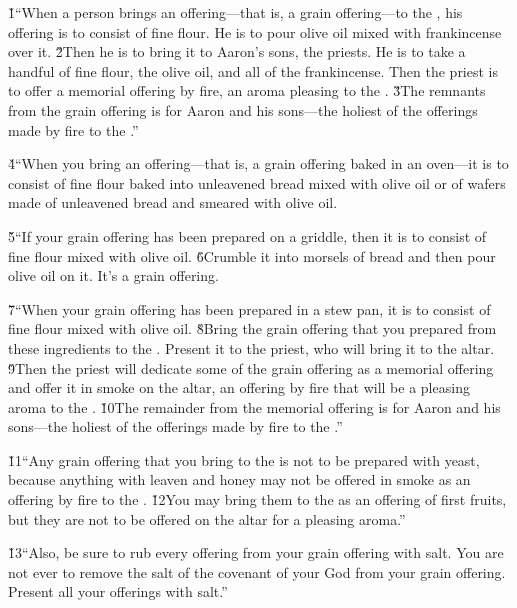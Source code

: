 \v{1}``When a person brings an offering---that is, a grain offering---to the , his offering is to consist of fine flour. He is to pour olive oil mixed with frankincense over it. \v{2}Then he is to bring it to Aaron's sons, the priests. He is to take a handful of fine flour, the olive oil, and all of the frankincense. Then the priest is to offer a memorial offering by fire, an aroma pleasing to the . \v{3}The remnants from the grain offering is for Aaron and his sons---the holiest of the offerings made by fire to the .''

\v{4}``When you bring an offering---that is, a grain offering baked in an oven---it is to consist of fine flour baked into unleavened bread mixed with olive oil or of wafers made of unleavened bread and smeared with olive oil.

\v{5}``If your grain offering has been prepared on a griddle, then it is to consist of fine flour mixed with olive oil. \v{6}Crumble it into morsels of bread and then pour olive oil on it. It's a grain offering.

\v{7}``When your grain offering has been prepared in a stew pan, it is to consist of fine flour mixed with olive oil. \v{8}Bring the grain offering that you prepared from these ingredients to the . Present it to the priest, who will bring it to the altar. \v{9}Then the priest will dedicate some of the grain offering as a memorial offering and offer it in smoke on the altar, an offering by fire that will be a pleasing aroma to the . \v{10}The remainder from the memorial offering is for Aaron and his sons---the holiest of the offerings made by fire to the .''

\v{11}``Any grain offering that you bring to the  is not to be prepared with yeast, because anything with leaven and honey may not be offered in smoke as an offering by fire to the . \v{12}You may bring them to the  as an offering of first fruits, but they are not to be offered on the altar for a pleasing aroma.''

\v{13}``Also, be sure to rub every offering from your grain offering with salt. You are not ever to remove the salt of the covenant of your God from your grain offering. Present all your offerings with salt.''

